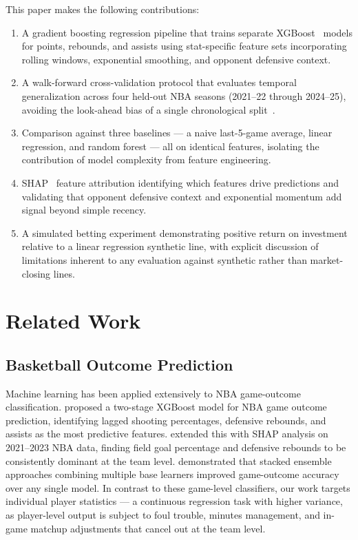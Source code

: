 \documentclass[12pt, letterpaper]{article}
\begin{document}
This paper makes the following contributions:
\begin{enumerate}
    \item A gradient boosting regression pipeline that trains separate
          XGBoost~\citep{chen2016xgboost} models for points, rebounds,
          and assists using stat-specific feature sets incorporating
          rolling windows, exponential smoothing, and opponent defensive context.
    \item A walk-forward cross-validation protocol that evaluates temporal
          generalization across four held-out NBA seasons (2021--22 through
          2024--25), avoiding the look-ahead bias of a single chronological
          split~\citep{cerqueira2020evaluating}.
    \item Comparison against three baselines --- a naive last-5-game average,
          linear regression, and random forest --- all on identical features,
          isolating the contribution of model complexity from feature
          engineering.
    \item SHAP~\citep{lundberg2017unified} feature attribution identifying
          which features drive predictions and validating that opponent
          defensive context and exponential momentum add signal beyond
          simple recency.
    \item A simulated betting experiment demonstrating positive return on
          investment relative to a linear regression synthetic line,
          with explicit discussion of limitations inherent to any
          evaluation against synthetic rather than market-closing lines.
\end{enumerate}

\section{Related Work}
\label{sec:related}

\subsection{Basketball Outcome Prediction}

Machine learning has been applied extensively to NBA game-outcome
classification.
\citet{chen2021hybrid} proposed a two-stage XGBoost model for NBA game
outcome prediction, identifying lagged shooting percentages, defensive
rebounds, and assists as the most predictive features.
\citet{ouyang2024xgboost} extended this with SHAP analysis on 2021--2023
NBA data, finding field goal percentage and defensive rebounds to be
consistently dominant at the team level.
\citet{nature2025stacked} demonstrated that stacked ensemble approaches
combining multiple base learners improved game-outcome accuracy over
any single model.
In contrast to these game-level classifiers, our work targets individual
player statistics --- a continuous regression task with higher variance,
as player-level output is subject to foul trouble, minutes management,
and in-game matchup adjustments that cancel out at the team level.
\end{document}
